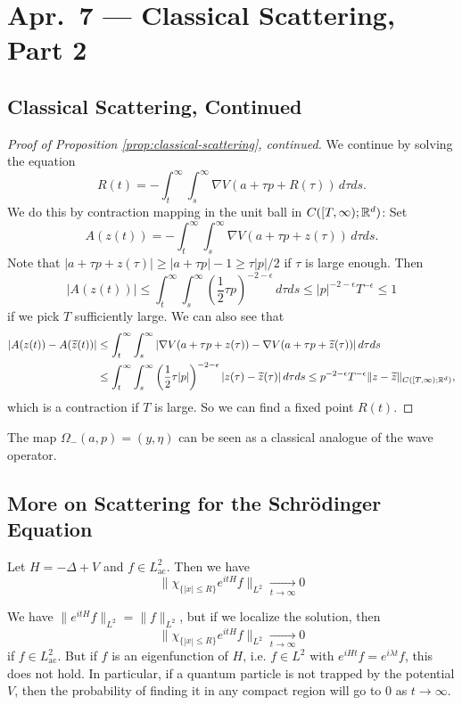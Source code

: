 \chapter{Apr.~7 --- Classical Scattering, Part 2}

\section{Classical Scattering, Continued}

\begin{proof}[Proof of Proposition \ref{prop:classical-scattering}, continued]
  We continue by solving the equation
  \[
    R(t) = -\int_t^\infty \int_s^\infty \nabla V(a + \tau p + R(\tau))\, d\tau ds.
  \]
  We do this by contraction mapping in the
  unit ball in $C([T, \infty); \mathbb{R}^d)$: Set
  \[
    A(z(t))
    = -\int_t^\infty \int_s^\infty \nabla V(a + \tau p + z(\tau))\, d\tau ds.
  \]
  Note that $|a + \tau p + z(\tau)| \ge |a + \tau p| - 1 \ge \tau |p| / 2$
  if $\tau$ is large enough. Then
  \[
    |A(z(t))|
    \le \int_t^\infty \int_s^\infty \left(\frac{1}{2} \tau p\right)^{-2 - \epsilon}\, d\tau ds
    \le |p|^{-2 - \epsilon} T^{-\epsilon} \le 1
  \]
  if we pick $T$ sufficiently large. We can
  also see that
  \begin{align*}
    |A(z(t)) - A(\widetilde{z}(t))|
    &\le \int_t^\infty \int_s^\infty
    |\nabla V(a + \tau p + z(\tau)) - \nabla V(a + \tau p + \widetilde{z}(\tau))|\, d\tau ds \\
    &\le \int_t^\infty \int_s^\infty
    \left(\frac{1}{2} \tau |p|\right)^{-2 - \epsilon}
    |z(\tau) - \widetilde{z}(\tau)|\, d\tau ds
    \le p^{-2 - \epsilon} T^{-\epsilon} \|z - \widetilde{z}\|_{C([T, \infty); \mathbb{R}^d)},
  \end{align*}
  which is a contraction if $T$ is large.
  So we can find a fixed point $R(t)$.
\end{proof}

\begin{remark}
  The map $\Omega_-(a, p) = (y, \eta)$
  can be seen as a classical analogue of the
  wave operator.
\end{remark}

\section{More on Scattering for the Schr\"odinger Equation}
\begin{lemma}
  Let $H = -\Delta + V$ and $f \in L^2_{\mathrm{ac}}$.
  Then we have
  \[
    \|\chi_{\{|x| \le R\}} e^{itH} f\|_{L^2} \xrightarrow[t \to \infty]{} 0
  \]
\end{lemma}

\begin{remark}
  We have $\|e^{itH} f\|_{L^2} = \|f\|_{L^2}$,
  but if we localize the solution, then
  \[
    \|\chi_{\{|x| \le R\}} e^{itH} f\|_{L^2} \xrightarrow[t \to \infty]{} 0
  \]
  if $f \in L^2_{\mathrm{ac}}$. But if
  $f$ is an eigenfunction of $H$, i.e.
  $f \in L^2$ with $e^{iH t} f = e^{i\lambda t} f$,
  this does not hold.
  In particular, if a quantum particle is
  not trapped by the potential $V$, then
  the probability of finding it in any
  compact region will go to $0$ as
  $t \to \infty$.
\end{remark}
